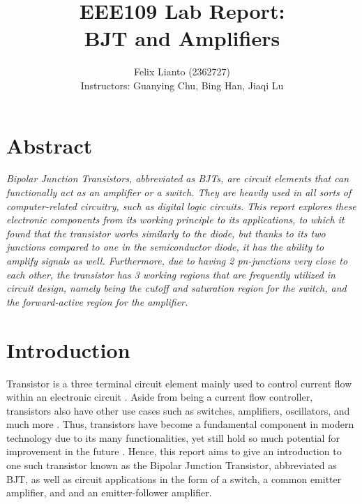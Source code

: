 \documentclass[11pt]{report}
\newenvironment{abstractText}{\timesNewRoman\itshape}{\par}
\begin{document}
	\title{\textbf{EEE109 Lab Report:}\\ BJT and Amplifiers}
	\author{Felix Lianto (2362727)\\
		[1cm]{\small Instructors: Guanying Chu, Bing Han, Jiaqi Lu}}
	\maketitle

\sectionfont{\itshape\fontsize{14pt}{15}\timesNewRoman\selectfont}
\section{Abstract}
\begin{abstractText}
	Bipolar Junction Transistors, abbreviated as BJTs, are circuit elements that can functionally act as an amplifier or a switch. They are heavily used in all sorts of computer-related circuitry, such as digital logic circuits. This report explores these electronic components from its working principle to its applications, to which it found that the transistor works similarly to the diode, but thanks to its two junctions compared to one in the semiconductor diode, it has the ability to amplify signals as well. Furthermore, due to having 2 pn-junctions very close to each other, the transistor has 3 working regions that are frequently utilized in circuit design, namely being the cutoff and saturation region for the switch, and the forward-active region for the amplifier.
\end{abstractText}

\rmfamily
\sectionfont{\fontsize{14pt}{15}\rmfamily\selectfont}
\section{Introduction}
Transistor is a three terminal circuit element mainly used to control current flow within an electronic circuit \autocite{subramaniNanoelectronicApplicationsCarbon2023}. Aside from being a current flow controller, transistors also have other use cases such as switches, amplifiers, oscillators, and much more \autocite{subramaniNanoelectronicApplicationsCarbon2023}. Thus, transistors have become a fundamental component in modern technology due to its many functionalities, yet still hold so much potential for improvement in the future \autocite{caoPublisherCorrectionFuture2023}. Hence, this report aims to give an introduction to one such transistor known as the Bipolar Junction Transistor, abbreviated as BJT, as well as circuit applications in the form of a switch, a common emitter amplifier, and and an emitter-follower amplifier.
\end{document}
